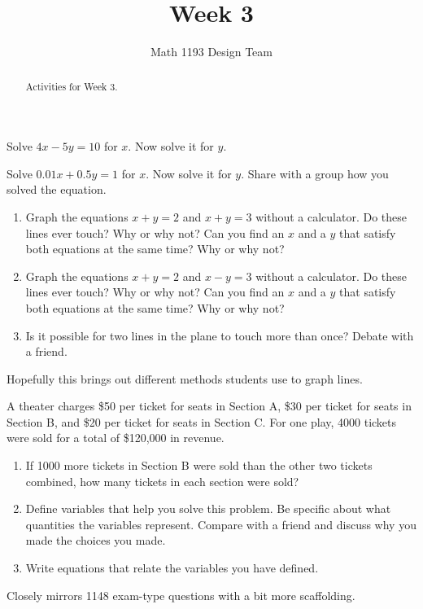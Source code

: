 \documentclass[noauthor,noinstructornotes]{ximera}
\title{Week 3}
\author{Math 1193 Design Team}
\begin{document}
\begin{abstract}
    Activities for Week 3.
\end{abstract}
\maketitle

\begin{problem}
Solve \(4x - 5y = 10\) for \(x\). Now solve it for \(y\).
\end{problem}

\begin{problem}
Solve \(0.01x + 0.5y = 1\) for \(x\). Now solve it for \(y\).
Share with a group how you solved the equation.
\end{problem}

\begin{problem}
\begin{enumerate}
    \item Graph the equations \(x + y = 2\) and \(x + y = 3\)
    without a calculator. Do these lines ever touch? Why or why not?
    Can you find an \(x\) and a \(y\) that satisfy both equations at 
    the same time? Why or why not? 
    \item Graph the equations \(x + y = 2\) and \(x - y = 3\)
    without a calculator. Do these lines ever touch? Why or why not?
    Can you find an \(x\) and a \(y\) that satisfy both equations at 
    the same time? Why or why not? 
    \item Is it possible for two lines in the 
    plane to touch more than once? Debate with a friend.
\end{enumerate}

\begin{instructorNotes}
Hopefully this brings out different methods students use to graph lines.
\end{instructorNotes}
\end{problem}

\begin{problem}
A theater charges \$50 per ticket for seats in Section A, 
\$30 per ticket for seats in Section B, and \$20 per ticket 
for seats in Section C. For one play, 4000 tickets were sold 
for a total of \$120,000 in revenue. 

\begin{enumerate}
    \item If 1000 more tickets in Section B were sold 
    than the other two tickets combined, how many tickets 
    in each section were sold?
    \item Define variables that help you solve this 
    problem. Be specific about what quantities the variables
    represent. Compare with a friend and discuss why you made 
    the choices you made.
    \item Write equations that relate the variables you 
    have defined.
\end{enumerate}

\begin{instructorNotes}
Closely mirrors 1148 exam-type questions with a bit more scaffolding.
\end{instructorNotes}
\end{problem}
\end{document}
